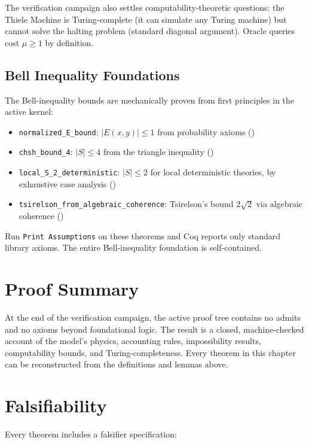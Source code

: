 The verification campaign also settles computability-theoretic questions: the Thiele Machine is Turing-complete (it can simulate any Turing machine) but cannot solve the halting problem (standard diagonal argument). Oracle queries cost $\mu \geq 1$ by definition.

\subsection{Bell Inequality Foundations}

The Bell-inequality bounds are mechanically proven from first principles in the active kernel:

\begin{itemize}
    \item \texttt{normalized\_E\_bound}: $|E(x,y)| \leq 1$ from probability axioms ()
    \item \texttt{chsh\_bound\_4}: $|S| \leq 4$ from the triangle inequality ()
    \item \texttt{local\_S\_2\_deterministic}: $|S| \leq 2$ for local deterministic theories, by exhaustive case analysis ()
    \item \texttt{tsirelson\_from\_algebraic\_coherence}: Tsirelson's bound $2\sqrt{2}$ via algebraic coherence ()
\end{itemize}

Run \texttt{Print Assumptions} on these theorems and Coq reports only standard library axioms. The entire Bell-inequality foundation is self-contained.

\section{Proof Summary}

At the end of the verification campaign, the active proof tree contains no admits and no axioms beyond foundational logic. The result is a closed, machine-checked account of the model’s physics, accounting rules, impossibility results, computability bounds, and Turing-completeness. Every theorem in this chapter can be reconstructed from the definitions and lemmas above.

\section{Falsifiability}

Every theorem includes a falsifier specification:

